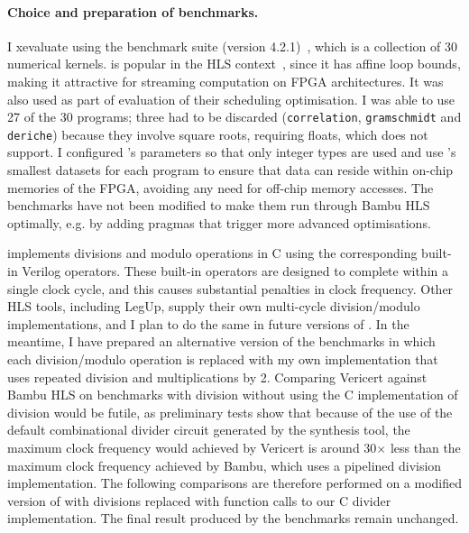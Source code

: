 \paragraph{Choice and preparation of benchmarks.} I xevaluate \vericert{} using
the \polybench{} benchmark suite (version 4.2.1)~\cite{pouchet20_polyb_c}, which
is a collection of 30 numerical kernels. \polybench{} is popular in the HLS
context~\cite{choi18_hbods,pouchet13_polyh,zhao17_comba,zuo13_improv}, since it
has affine loop bounds, making it attractive for streaming computation on FPGA
architectures.  It was also used as part of
\textcite{six22_formal_verif_super_sched} evaluation of their scheduling
optimisation.  I was able to use 27 of the 30 programs; three had to be
discarded (\texttt{cor\-re\-la\-tion}, \texttt{gram\-schmi\-dt} and
\texttt{de\-riche}) because they involve square roots, requiring floats, which
\vericert{} does not support.  I configured \polybench{}'s parameters so that
only integer types are used and use \polybench{}'s smallest datasets for each
program to ensure that data can reside within on-chip memories of the FPGA,
avoiding any need for off-chip memory accesses. The benchmarks have not been
modified to make them run through Bambu HLS optimally, e.g. by adding pragmas
that trigger more advanced optimisations.

\vericert{} implements divisions and modulo operations in C using the
corresponding built-in Verilog operators. These built-in operators are designed
to complete within a single clock cycle, and this causes substantial penalties
in clock frequency.  Other HLS tools, including LegUp, supply their own
multi-cycle division/modulo implementations, and I plan to do the same in future
versions of \vericert{}.  In the meantime, I have prepared an alternative
version of the benchmarks in which each division/modulo operation is replaced
with my own implementation that uses repeated division and multiplications by 2.
Comparing Vericert against Bambu HLS on benchmarks with division without using
the C implementation of division would be futile, as preliminary tests show that
because of the use of the default combinational divider circuit generated by the
synthesis tool, the maximum clock frequency would achieved by Vericert is around
30$\times$ less than the maximum clock frequency achieved by Bambu, which uses a
pipelined division implementation.  The following comparisons are therefore
performed on a modified version of \polybench{} with divisions replaced with
function calls to our C divider implementation.  The final result produced by
the benchmarks remain unchanged.

